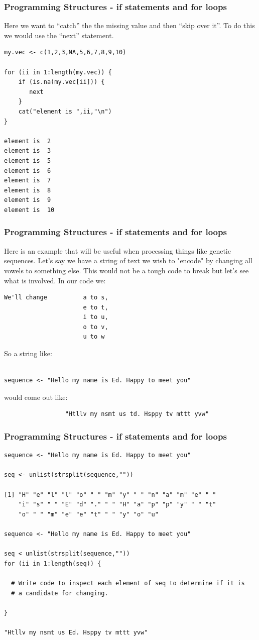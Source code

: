 \documentclass{beamer}
\begin{document}
\begin{frame}[fragile]
\frametitle{Programming Structures - if statements and for loops}
Here we want to ``catch'' the the missing value and then ``skip over it''.  To do this we would use the ``next'' statement.
\footnotesize
\begin{verbatim}
my.vec <- c(1,2,3,NA,5,6,7,8,9,10)

for (ii in 1:length(my.vec)) {
    if (is.na(my.vec[ii])) {
       next
    }
    cat("element is ",ii,"\n")
}

element is  2 
element is  3 
element is  5 
element is  6 
element is  7 
element is  8 
element is  9 
element is  10 
\end{verbatim}
\end{frame}

%

\begin{frame}[fragile]
\frametitle{Programming Structures - if statements and for loops}
Here is an example that will be useful when processing things like genetic sequences. Let's say we have a string of text we wish to "encode" by changing all vowels to something else. This would not be a tough code to break but let's see what is involved. In our code we:
\footnotesize
\begin{verbatim}
We'll change          a to s, 
                      e to t, 
                      i to u, 
                      o to v, 
                      u to w 
\end{verbatim}
\normalsize
So a string like:
\footnotesize
\begin{verbatim}

sequence <- "Hello my name is Ed. Happy to meet you" 
\end{verbatim}
\normalsize
would come out like:
\footnotesize
\begin{verbatim}
                 "Htllv my nsmt us td. Hsppy tv mttt yvw"
\end{verbatim}
\end{frame}

%

\begin{frame}[fragile]
\frametitle{Programming Structures - if statements and for loops}
\footnotesize
\begin{verbatim}
sequence <- "Hello my name is Ed. Happy to meet you" 

seq <- unlist(strsplit(sequence,""))

[1] "H" "e" "l" "l" "o" " " "m" "y" " " "n" "a" "m" "e" " " 
    "i" "s" " " "E" "d" "." " " "H" "a" "p" "p" "y" " " "t" 
    "o" " " "m" "e" "e" "t" " " "y" "o" "u"

sequence <- "Hello my name is Ed. Happy to meet you" 

seq < unlist(strsplit(sequence,""))
for (ii in 1:length(seq)) {

  # Write code to inspect each element of seq to determine if it is 
  # a candidate for changing.

}

"Htllv my nsmt us Ed. Hsppy tv mttt yvw"

\end{verbatim}
\end{frame}
\end{document}
